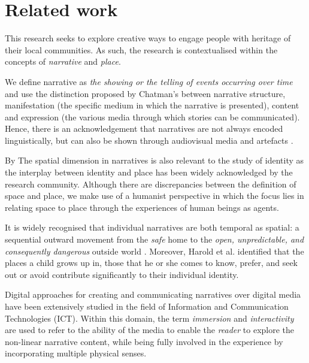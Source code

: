 \documentclass[acmlarge,screen,dvipsnames]{acmart}
\begin{document}
\section{Related work} 
\label{ref}
This research seeks to explore creative ways to engage people with heritage of their local communities. As such, the research is contextualised within the concepts of \emph{narrative} and \emph{place}.

We define narrative as \emph{the showing or the telling of events occurring over time} \cite{10.2307/1343711} and use the distinction proposed by Chatman's \cite{10.2307/468421} between narrative structure, manifestation (the specific medium in which the narrative is presented), content and expression (the various media through which stories can be communicated). Hence, there is an acknowledgement that narratives are not always encoded linguistically, but can also be shown through audiovisual media and artefacts \cite{PAHL2004339}.  


By The spatial dimension in narratives is also relevant to the study of identity as the interplay between identity and place has been widely acknowledged by the research community. Although there are discrepancies between the definition of space and place, we make use of a humanist perspective in which the focus lies in relating space to place through the experiences of human beings as agents. 

It is widely recognised that individual narratives are both temporal as spatial: a sequential outward movement from the \emph{safe} home to the \emph{open, unpredictable, and consequently dangerous} outside world \cite{Bruner2004-BRULAN}. Moreover, Harold et al. \cite{PROSHANSKY198357} identified that the places a child grows up in, those that he or she comes to know, prefer, and seek out or avoid contribute significantly to their individual identity. 



Digital approaches for creating and communicating narratives over digital media have been extensively studied in the field of Information and Communication Technologies (ICT). Within this domain, the term \emph{immersion} and \emph{interactivity} are used to refer to the ability of the media to enable the \emph{reader} to explore the non-linear narrative content, while being fully involved in the experience by incorporating multiple physical senses.
\end{document}
